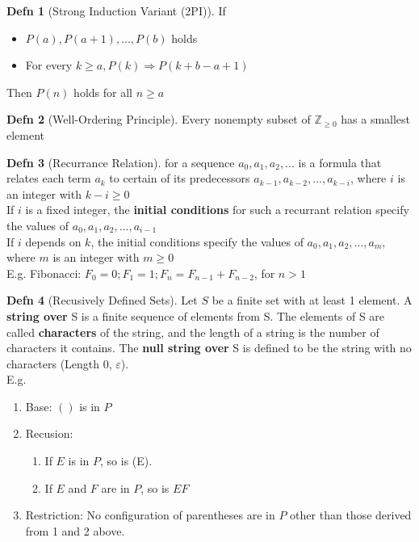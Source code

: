 \documentclass[a4paper]{article}
\theoremstyle{definition}
\newtheorem*{defn}{Defn}
\begin{document}
\begin{defn}[Strong Induction Variant (2PI)] If
  \begin{itemize}
    \item $P(a), P(a+1),...,P(b)$ holds
    \item For every $k \geq a, P(k) \Rightarrow P(k+b-a+1)$
  \end{itemize}
  Then $P(n)$ holds for all $n \geq a$
\end{defn}

\begin{defn}[Well-Ordering Principle]
  Every nonempty subset of $\mathbb{Z}_{\geq 0}$ has a smallest element
\end{defn}

\begin{defn}[Recurrance Relation] for a sequence $a_0, a_1, a_2,...$ is a formula that relates each term $a_k$ to certain of its predecessors $a_{k-1},a_{k-2},...,a_{k-i}$, where $i$ is an integer with $k-i \geq 0$\\ If $i$ is a fixed integer, the \textbf{initial conditions} for such a recurrant relation specify the values of $a_0,a_1,a_2,...,a_{i-1}$\\
  If $i$ depends on $k$, the initial conditions specify the values of $a_0,a_1,a_2,...,a_{m}$, where $m$ is an integer with $m \geq 0$\\
  E.g. Fibonacci: $F_0 = 0; F_1 = 1; F_n = F_{n-1} +F_{n-2}$, for $n > 1$
\end{defn}

\begin{defn}[Recusively Defined Sets]
  Let $S$ be a finite set with at least 1 element. A \textbf{string over} S is a finite sequence of elements from S. The elements of S are called \textbf{characters} of the string, and the length of a string is the number of characters it contains. The \textbf{null string over} S is defined to be the string with no characters (Length 0, $\varepsilon$).\\
  E.g.
  \begin{enumerate}
    \item Base: $()$ is in $P$
    \item Recusion: 
      \begin{enumerate}
        \item If $E$ is in $P$, so is (E).
        \item If $E$ and $F$ are in $P$, so is $EF$
      \end{enumerate}
    \item Restriction: No configuration of parentheses are in $P$ other than those derived from 1 and 2 above.
  \end{enumerate}
\end{defn}
\end{document}
